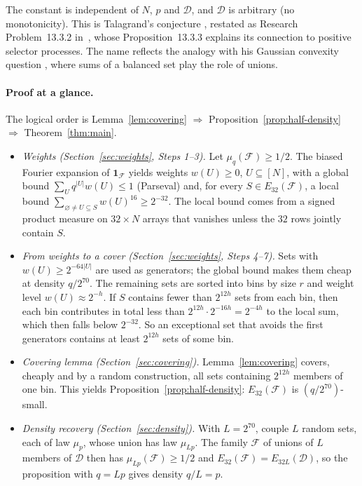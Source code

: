 \documentclass[11pt,letterpaper]{article}
\theoremstyle{definition}
\theoremstyle{remark}
\numberwithin{equation}{section}
\begin{document}
The constant is independent of $N$, $p$ and $\mathcal D$, and
$\mathcal D$ is arbitrary (no monotonicity). This is Talagrand's
conjecture \cite[Conjecture~7.1]{Talagrand10}, restated as Research
Problem~13.3.2 in~\cite{Talagrand21}, whose Proposition~13.3.3 explains
its connection to positive selector processes. The name reflects the
analogy with his Gaussian convexity question
\cite[Conjecture~2.1]{Talagrand10}, where sums of a balanced set play the
role of unions.

\paragraph{Proof at a glance.}
The logical order is
Lemma~\ref{lem:covering} $\Rightarrow$
Proposition~\ref{prop:half-density} $\Rightarrow$
Theorem~\ref{thm:main}.
\begin{itemize}
\item \emph{Weights (Section~\ref{sec:weights}, Steps 1--3).}
Let $\mu_q(\mathcal F)\ge1/2$. The biased Fourier expansion of
$\mathbf 1_{\mathcal F}$ yields weights $w(U)\ge0$, $U\subseteq[N]$, with
a global bound $\sum_Uq^{|U|}w(U)\le1$ (Parseval) and, for every
$S\in E_{32}(\mathcal F)$, a local bound
$\sum_{\varnothing\ne U\subseteq S}w(U)^{16}\ge2^{-32}$. The local bound
comes from a signed product measure on $32\times N$ arrays that vanishes
unless the $32$ rows jointly contain $S$.
\item \emph{From weights to a cover (Section~\ref{sec:weights}, Steps 4--7).}
Sets with $w(U)\ge2^{-64|U|}$ are used as generators; the global bound
makes them cheap at density $q/2^{70}$. The remaining sets are sorted
into bins by size $r$ and weight level $w(U)\approx2^{-h}$. If $S$
contains fewer than $2^{12h}$ sets from each bin, then each bin
contributes in total less than $2^{12h}\cdot2^{-16h}=2^{-4h}$ to the
local sum, which then falls below $2^{-32}$. So an exceptional set that
avoids the first generators contains at least $2^{12h}$ sets of some bin.
\item \emph{Covering lemma (Section~\ref{sec:covering}).}
Lemma~\ref{lem:covering} covers, cheaply and by a random construction,
all sets containing $2^{12h}$ members of one bin. This yields
Proposition~\ref{prop:half-density}: $E_{32}(\mathcal F)$ is
$(q/2^{70})$-small.
\item \emph{Density recovery (Section~\ref{sec:density}).}
With $L=2^{70}$, couple $L$ random sets, each of law $\mu_p$, whose union
has law $\mu_{Lp}$. The family $\mathcal F$ of unions of $L$ members of
$\mathcal D$ then has $\mu_{Lp}(\mathcal F)\ge1/2$ and
$E_{32}(\mathcal F)=E_{32L}(\mathcal D)$, so the proposition with $q=Lp$
gives density $q/L=p$.
\end{itemize}
\end{document}
